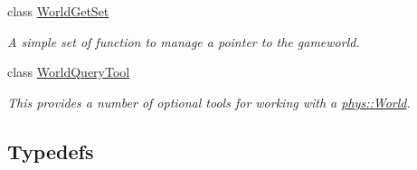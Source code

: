 \begin{DoxyCompactItemize}
class \hyperlink{classphys_1_1WorldGetSet}{WorldGetSet}
\begin{DoxyCompactList}\small\item\em A simple set of function to manage a pointer to the gameworld. \item\end{DoxyCompactList}\item 
class \hyperlink{classphys_1_1WorldQueryTool}{WorldQueryTool}
\begin{DoxyCompactList}\small\item\em This provides a number of optional tools for working with a \hyperlink{classphys_1_1World}{phys::World}. \item\end{DoxyCompactList}\end{DoxyCompactItemize}
\subsection*{Typedefs}
